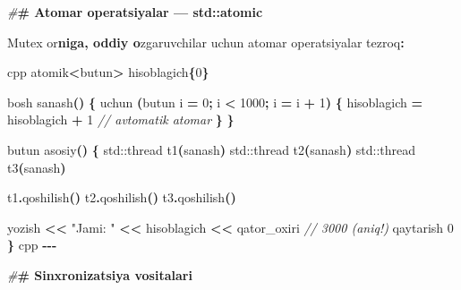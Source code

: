 \documentclass[a4paper,11pt,twoside,openright]{book}
\newenvironment{Shaded}{\begin{snugshade}}{\end{snugshade}}
\newcommand{\BuiltInTok}[1]{#1}
\newcommand{\CharTok}[1]{\textcolor[rgb]{0.31,0.60,0.02}{#1}}
\newcommand{\CommentTok}[1]{\textcolor[rgb]{0.56,0.35,0.01}{\textit{#1}}}
\newcommand{\DecValTok}[1]{\textcolor[rgb]{0.00,0.00,0.81}{#1}}
\newcommand{\ErrorTok}[1]{\textcolor[rgb]{0.64,0.00,0.00}{\textbf{#1}}}
\newcommand{\NormalTok}[1]{#1}
\newcommand{\OperatorTok}[1]{\textcolor[rgb]{0.81,0.36,0.00}{\textbf{#1}}}
\newcommand{\PreprocessorTok}[1]{\textcolor[rgb]{0.56,0.35,0.01}{\textit{#1}}}
\newcommand{\StringTok}[1]{\textcolor[rgb]{0.31,0.60,0.02}{#1}}
\begin{document}
\begin{Shaded}
\begin{Highlighting}[]
\PreprocessorTok{\#}\ErrorTok{\# Atomar operatsiyalar — \textasciigrave{}std::atomic\textasciigrave{}}

\NormalTok{Mutex o}\CharTok{\textquotesingle{}r}\ErrorTok{niga, oddiy o}\CharTok{\textquotesingle{}}\NormalTok{zgaruvchilar uchun atomar operatsiyalar tezroq}\OperatorTok{:}

\ErrorTok{\textasciigrave{}\textasciigrave{}\textasciigrave{}}\NormalTok{cpp}
\NormalTok{atomik}\OperatorTok{\textless{}}\NormalTok{butun}\OperatorTok{\textgreater{}}\NormalTok{ hisoblagich}\OperatorTok{\{}\DecValTok{0}\OperatorTok{\}}

\NormalTok{bosh sanash}\OperatorTok{()} \OperatorTok{\{}
\NormalTok{    uchun }\OperatorTok{(}\NormalTok{butun i }\OperatorTok{=} \DecValTok{0}\OperatorTok{;}\NormalTok{ i }\OperatorTok{\textless{}} \DecValTok{1000}\OperatorTok{;}\NormalTok{ i }\OperatorTok{=}\NormalTok{ i }\OperatorTok{+} \DecValTok{1}\OperatorTok{)} \OperatorTok{\{}
\NormalTok{        hisoblagich }\OperatorTok{=}\NormalTok{ hisoblagich }\OperatorTok{+} \DecValTok{1}   \CommentTok{// avtomatik atomar}
    \OperatorTok{\}}
\OperatorTok{\}}

\NormalTok{butun asosiy}\OperatorTok{()} \OperatorTok{\{}
    \BuiltInTok{std::}\NormalTok{thread t1}\OperatorTok{(}\NormalTok{sanash}\OperatorTok{)}
    \BuiltInTok{std::}\NormalTok{thread t2}\OperatorTok{(}\NormalTok{sanash}\OperatorTok{)}
    \BuiltInTok{std::}\NormalTok{thread t3}\OperatorTok{(}\NormalTok{sanash}\OperatorTok{)}

\NormalTok{    t1}\OperatorTok{.}\NormalTok{qoshilish}\OperatorTok{()}
\NormalTok{    t2}\OperatorTok{.}\NormalTok{qoshilish}\OperatorTok{()}
\NormalTok{    t3}\OperatorTok{.}\NormalTok{qoshilish}\OperatorTok{()}

\NormalTok{    yozish }\OperatorTok{\textless{}\textless{}} \StringTok{"Jami: "} \OperatorTok{\textless{}\textless{}}\NormalTok{ hisoblagich }\OperatorTok{\textless{}\textless{}}\NormalTok{ qator\_oxiri   }\CommentTok{// 3000 (aniq!)}
\NormalTok{    qaytarish }\DecValTok{0}
\OperatorTok{\}}
\ErrorTok{\textasciigrave{}\textasciigrave{}\textasciigrave{}}\NormalTok{cpp}
\OperatorTok{{-}{-}{-}}

\PreprocessorTok{\#}\ErrorTok{\# Sinxronizatsiya vositalari}


\end{Highlighting}
\end{Shaded}
\end{document}
